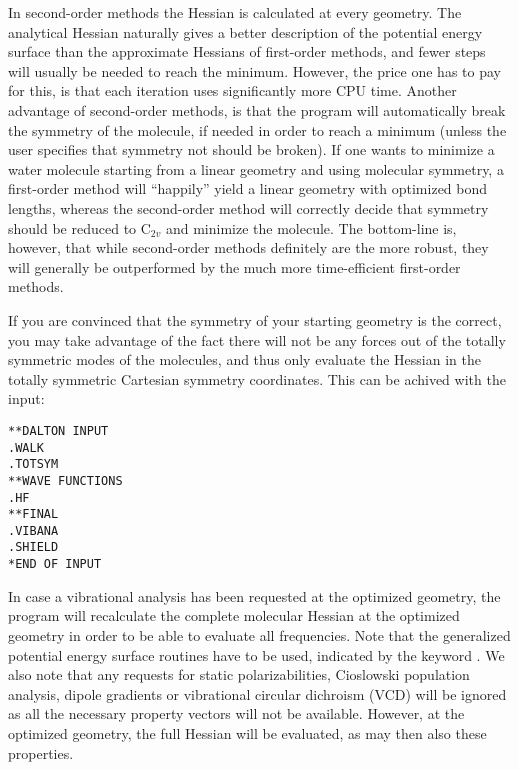 In second-order methods the Hessian is calculated at every
geometry. The analytical Hessian naturally gives a better description
of the potential energy surface than the approximate Hessians of
first-order methods, and fewer steps will usually be needed to reach
the minimum. However, the price one has to pay for this, is that each
iteration uses significantly more CPU time. Another advantage of
second-order methods, is that the program will automatically break the
symmetry of the molecule, if needed in order
to reach a minimum 
(unless the user specifies that symmetry not should be broken). If
one wants to minimize a water molecule starting from a linear
geometry and using molecular symmetry, a first-order method will
``happily'' yield a linear geometry with optimized bond lengths, whereas
the second-order method will correctly decide that symmetry should be
reduced to C$_{2v}$ and minimize the molecule.
The bottom-line is, however, that while second-order methods
definitely are the more robust, they will generally be outperformed by
the much more time-efficient first-order methods.

If you are convinced that the symmetry of your starting geometry is
the correct, you may take advantage of the fact there will not be any
forces out of the totally symmetric modes of the molecules, and thus
only evaluate the Hessian in the totally symmetric Cartesian symmetry
coordinates. This can be achived with the input:

\begin{verbatim}
**DALTON INPUT
.WALK
.TOTSYM
**WAVE FUNCTIONS
.HF
**FINAL
.VIBANA
.SHIELD
*END OF INPUT
\end{verbatim}

In case a vibrational analysis has been requested at the optimized
geometry, the program will recalculate the complete molecular Hessian
at the optimized geometry in order to be able to evaluate all
frequencies. Note that the generalized potential energy surface
routines have to be used, indicated by the keyword . We also
note that any requests for static
polarizabilities, Cioslowski population
analysis, dipole gradients or vibrational circular dichroism (VCD) will be ignored as all the necessary
property vectors will not be available. However, at the optimized
geometry, the full Hessian will be evaluated, as may then also these
properties.


